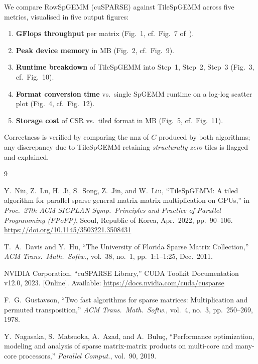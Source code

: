 \documentclass[conference]{IEEEtran}
\begin{document}
We compare RowSpGEMM (cuSPARSE) against TileSpGEMM across five metrics,
visualised in five output figures:
\begin{enumerate}
\item \textbf{GFlops throughput} per matrix (Fig.~1, cf.\ Fig.~7 of~\cite{tilespgemm}).
\item \textbf{Peak device memory} in MB (Fig.~2, cf.\ Fig.~9).
\item \textbf{Runtime breakdown} of TileSpGEMM into Step~1, Step~2, Step~3 (Fig.~3, cf.\ Fig.~10).
\item \textbf{Format conversion time} vs.\ single SpGEMM runtime on a
  log-log scatter plot (Fig.~4, cf.\ Fig.~12).
\item \textbf{Storage cost} of CSR vs.\ tiled format in MB (Fig.~5,
  cf.\ Fig.~11).
\end{enumerate}
Correctness is verified by comparing the nnz of $C$ produced by both
algorithms; any discrepancy due to TileSpGEMM retaining
\emph{structurally zero} tiles is flagged and explained.

\begin{thebibliography}{9}

Y.\ Niu, Z.\ Lu, H.\ Ji, S.\ Song, Z.\ Jin, and W.\ Liu,
``TileSpGEMM: A tiled algorithm for parallel sparse general matrix-matrix
multiplication on GPUs,''
in \textit{Proc.\ 27th ACM SIGPLAN Symp.\ Principles and Practice of
Parallel Programming (PPoPP)}, Seoul, Republic of Korea, Apr.\ 2022,
pp.\ 90--106.
\url{https://doi.org/10.1145/3503221.3508431}

T.\ A.\ Davis and Y.\ Hu,
``The University of Florida Sparse Matrix Collection,''
\textit{ACM Trans.\ Math.\ Softw.}, vol.\ 38, no.\ 1, pp.\ 1:1--1:25,
Dec.\ 2011.

NVIDIA Corporation,
``cuSPARSE Library,'' CUDA Toolkit Documentation v12.0, 2023.
[Online]. Available: \url{https://docs.nvidia.com/cuda/cusparse}

F.\ G.\ Gustavson,
``Two fast algorithms for sparse matrices: Multiplication and permuted
transposition,''
\textit{ACM Trans.\ Math.\ Softw.}, vol.\ 4, no.\ 3, pp.\ 250--269, 1978.

Y.\ Nagasaka, S.\ Matsuoka, A.\ Azad, and A.\ Bulu\c{c},
``Performance optimization, modeling and analysis of sparse
matrix-matrix products on multi-core and many-core processors,''
\textit{Parallel Comput.}, vol.\ 90, 2019.

\end{thebibliography}
\end{document}
